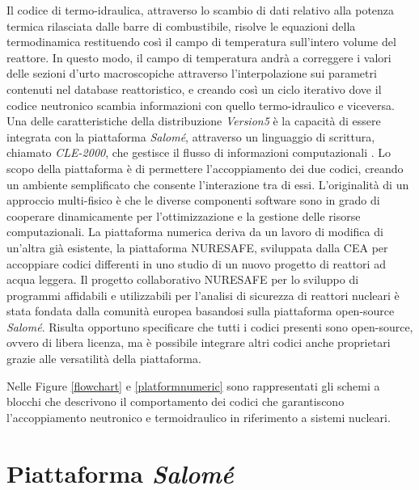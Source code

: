 Il codice di termo-idraulica, attraverso lo scambio di dati relativo alla 
potenza 
termica rilasciata dalle barre di combustibile, risolve le equazioni della 
termodinamica restituendo così il campo di temperatura sull'intero volume del 
reattore.
In questo modo, il campo di temperatura andrà a correggere i valori delle 
sezioni d'urto macroscopiche attraverso l'interpolazione sui parametri contenuti 
nel database 
reattoristico, e creando così un ciclo iterativo dove il codice neutronico scambia 
informazioni con quello termo-idraulico e viceversa.
Una delle caratteristiche della distribuzione \textit{Version5} è la capacità 
di 
essere integrata con la piattaforma \textit{Salom\'e}, attraverso un linguaggio 
di 
scrittura, chiamato \textit{CLE-2000}, che gestisce il flusso di informazioni 
computazionali \cite{DDhebe}.
Lo scopo della piattaforma è di permettere l'accoppiamento dei due codici, 
creando un ambiente semplificato che consente l'interazione tra di essi. 
L'originalità di un approccio multi-fisico è che le diverse componenti software 
sono in grado di cooperare dinamicamente per l'ottimizzazione e la gestione 
delle risorse computazionali.
La piattaforma numerica deriva da un lavoro di modifica di un'altra già 
esistente, la piattaforma NURESAFE, sviluppata dalla CEA per accoppiare codici 
differenti in uno studio di un nuovo progetto di reattori ad acqua leggera.
Il progetto collaborativo NURESAFE per lo sviluppo di programmi affidabili e
utilizzabili per l'analisi di sicurezza di reattori nucleari è stata fondata 
dalla comunità europea basandosi sulla piattaforma open-source 
\textit{Salom\'e}.
Risulta opportuno specificare che tutti i codici presenti sono open-source, ovvero di libera licenza, ma è 
possibile integrare altri codici anche proprietari grazie alle versatilità della 
piattaforma. 

Nelle Figure \ref{flowchart} e \ref{platformnumeric} sono rappresentati gli 
schemi a blocchi che descrivono il comportamento dei codici che garantiscono 
l'accoppiamento neutronico e termoidraulico in riferimento a sistemi nucleari. 


\section{Piattaforma \textit{Salom\'e}}

